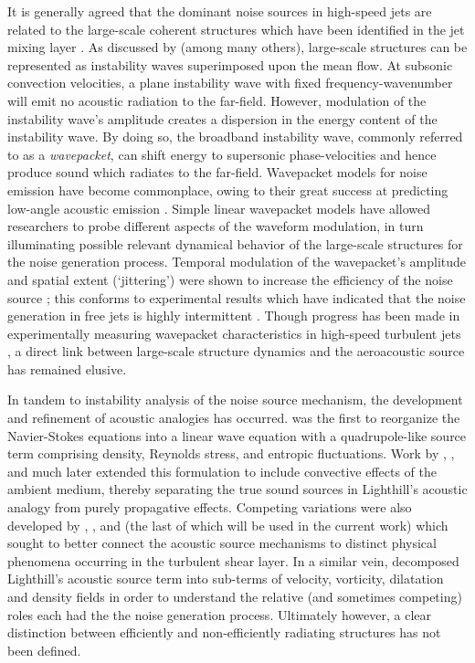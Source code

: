 It is generally agreed that the dominant noise sources in high-speed jets are related to the large-scale coherent structures which have been identified in the jet mixing layer \citep{Arndt1997}. 
As discussed by \citet{Tam1995} (among many others), large-scale structures can be represented as instability waves superimposed upon the mean flow.
At subsonic convection velocities, a plane instability wave with fixed frequency-wavenumber will emit no acoustic radiation to the far-field.
However, modulation of the instability wave's amplitude creates a dispersion in the energy content of the instability wave.
By doing so, the broadband instability wave, commonly referred to as a \emph{wavepacket}, can shift energy to supersonic phase-velocities and hence produce sound which radiates to the far-field.
Wavepacket models for noise emission have become commonplace, owing to their great success at predicting low-angle acoustic emission \citep{Obrist2011}.
Simple linear wavepacket models have allowed researchers to probe different aspects of the waveform modulation, in turn illuminating possible relevant dynamical behavior of the large-scale structures for the noise generation process.
Temporal modulation of the wavepacket's amplitude and spatial extent (`jittering') were shown to increase the efficiency of the noise source \citep{Cavalieri2010}; this conforms to experimental results which have indicated that the noise generation in free jets is highly intermittent \citep{Hileman2005,Kearney-Fischer2013}. 
Though progress has been made in experimentally measuring wavepacket characteristics in high-speed turbulent jets \citep{Cavalieri2013,Baqui2014}, a direct link between large-scale structure dynamics and the aeroacoustic source has remained elusive.

In tandem to instability analysis of the noise source mechanism, the development and refinement of acoustic analogies has occurred. 
\citet{Lighthill1952} was the first to reorganize the Navier-Stokes equations into a linear wave equation with a quadrupole-like source term comprising density, Reynolds stress, and entropic fluctuations.
Work by \citet{Phillips1960}, \citet{Lilley1974}, and much later \citet{Goldstein2003} extended this formulation to include convective effects of the ambient medium, thereby separating the true sound sources in Lighthill's acoustic analogy from purely propagative effects.
Competing variations were also developed by \citet{Powell1964}, \citet{Howe1975}, and \citet{Ribner1962} (the last of which will be used in the current work) which sought to better connect the acoustic source mechanisms to distinct physical phenomena occurring in the turbulent shear layer.
In a similar vein, \citet{Cabana2008} decomposed Lighthill's acoustic source term into sub-terms of velocity, vorticity, dilatation and density fields in order to understand the relative (and sometimes competing) roles each had the the noise generation process.
Ultimately however, a clear distinction between efficiently and non-efficiently radiating structures has not been defined.


